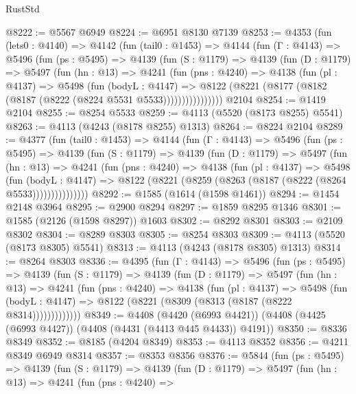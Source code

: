 \begin{lexlean}{RustStd}
\begin{coremodule}
@8222 := @5567 @6949
@8224 := @6951 @8130 @7139
@8253 := @4353
    (fun (lets0 : @4140) =>
    @4142
      (fun (tail0 : @1453) =>
      @4144
        (fun (Γ : @4143) =>
        @5496
          (fun (ps : @5495) =>
          @4139
            (fun (S : @1179) =>
            @4139
              (fun (D : @1179) =>
              @5497
                (fun (hn : @13) =>
                @4241
                  (fun (pns : @4240) =>
                  @4138
                    (fun (pl : @4137) =>
                    @5498
                      (fun (bodyL : @4147) =>
                      @8122 (@8221 (@8177 (@8182 (@8187 (@8222 (@8224 @5531 @5533))))))))))))))))
    @2104
@8254 := @1419 @2104
@8255 := @8254 @5533
@8259 := @4113 (@5520 (@8173 @8255) @5541)
@8263 := @4113 (@4243 (@8178 @8255) @1313)
@8264 := @8224 @2104
@8289 := @4377
    (fun (tail0 : @1453) =>
    @4144
      (fun (Γ : @4143) =>
      @5496
        (fun (ps : @5495) =>
        @4139
          (fun (S : @1179) =>
          @4139
            (fun (D : @1179) =>
            @5497
              (fun (hn : @13) =>
              @4241
                (fun (pns : @4240) =>
                @4138
                  (fun (pl : @4137) =>
                  @5498
                    (fun (bodyL : @4147) =>
                    @8122 (@8221 (@8259 (@8263 (@8187 (@8222 (@8264 @5533)))))))))))))))
@8292 := @1585 (@1614 (@1598 @1461))
@8294 := @1454 @2148 @3964
@8295 := @2900 @8294
@8297 := @1859 @8295 @1346
@8301 := @1585 (@2126 (@1598 @8297)) @1603
@8302 := @8292 @8301
@8303 := @2109 @8302
@8304 := @8289 @8303
@8305 := @8254 @8303
@8309 := @4113 (@5520 (@8173 @8305) @5541)
@8313 := @4113 (@4243 (@8178 @8305) @1313)
@8314 := @8264 @8303
@8336 := @4395
    (fun (Γ : @4143) =>
    @5496
      (fun (ps : @5495) =>
      @4139
        (fun (S : @1179) =>
        @4139
          (fun (D : @1179) =>
          @5497
            (fun (hn : @13) =>
            @4241
              (fun (pns : @4240) =>
              @4138
                (fun (pl : @4137) =>
                @5498
                  (fun (bodyL : @4147) =>
                  @8122 (@8221 (@8309 (@8313 (@8187 (@8222 @8314)))))))))))))
@8349 := @4408
    (@4420 (@6993 @4421))
    (@4408 (@4425 (@6993 @4427)) (@4408 (@4431 (@4413 @445 @4433)) @4191))
@8350 := @8336 @8349
@8352 := @8185 (@4204 @8349)
@8353 := @4113 @8352
@8356 := @4211 @8349 @6949 @8314
@8357 := @8353 @8356
@8376 := @5844
    (fun (ps : @5495) =>
    @4139
      (fun (S : @1179) =>
      @4139
        (fun (D : @1179) =>
        @5497
          (fun (hn : @13) =>
          @4241
            (fun (pns : @4240) =>

\end{coremodule}
\end{lexlean}
